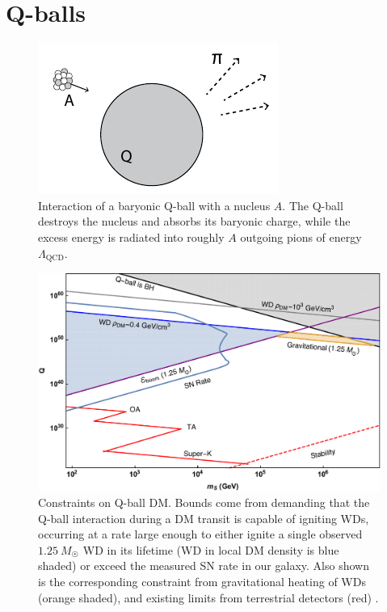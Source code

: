 \documentclass[twocolumn, preprintnumbers,amsmath,amssymb,prd, superscriptaddress]{revtex4}
\begin{document}
\section{Q-balls}
\label{sec:qballs}


\begin{figure}
\includegraphics[scale=1.0]{qball-cartoon.pdf}
\caption{Interaction of a baryonic Q-ball with a nucleus $A$. The Q-ball destroys the nucleus and absorbs its baryonic charge, while the excess energy is radiated into roughly $A$ outgoing pions of energy $\Lambda_\text{QCD}$.}
\label{fig:qball-cartoon}
\end{figure}

\begin{figure}
\includegraphics[scale=.35]{Qballconstraint.pdf}
\caption{
Constraints on Q-ball DM. 
Bounds come from demanding that the Q-ball interaction during a DM transit is capable of igniting WDs, occurring at a rate large enough to either ignite a single observed $1.25~M_{\astrosun}$ WD in its lifetime (WD in local DM density is blue shaded) or exceed the measured SN rate in our galaxy. 
Also shown is the corresponding constraint from gravitational heating of WDs (orange shaded), and existing limits from terrestrial detectors (red) \cite{Dine:2003ax}.}
\label{fig:Qballconstraint}
\end{figure}
\end{document}

